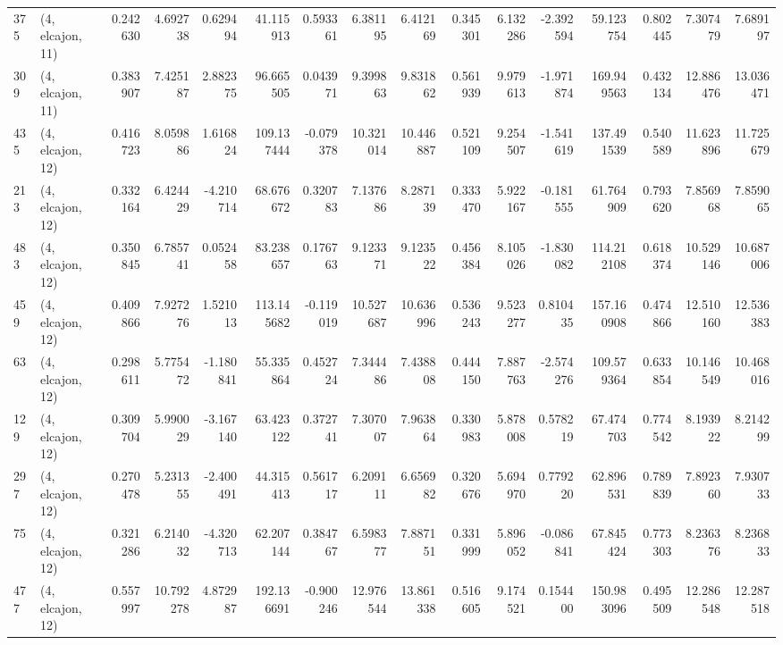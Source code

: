 \begin{tabular}{llrrrrrrrrrrrrrr}
375 &  (4, elcajon, 11) &   0.242630 &   4.692738 &   0.629494 &    41.115913 &   0.593361 &   6.381195 &   6.412169 &  0.345301 &   6.132286 &  -2.392594 &     59.123754 &    0.802445 &    7.307479 &    7.689197 \\
309 &  (4, elcajon, 11) &   0.383907 &   7.425187 &   2.882375 &    96.665505 &   0.043971 &   9.399863 &   9.831862 &  0.561939 &   9.979613 &  -1.971874 &    169.949563 &    0.432134 &   12.886476 &   13.036471 \\
435 &  (4, elcajon, 12) &   0.416723 &   8.059886 &   1.616824 &   109.137444 &  -0.079378 &  10.321014 &  10.446887 &  0.521109 &   9.254507 &  -1.541619 &    137.491539 &    0.540589 &   11.623896 &   11.725679 \\
213 &  (4, elcajon, 12) &   0.332164 &   6.424429 &  -4.210714 &    68.676672 &   0.320783 &   7.137686 &   8.287139 &  0.333470 &   5.922167 &  -0.181555 &     61.764909 &    0.793620 &    7.856968 &    7.859065 \\
483 &  (4, elcajon, 12) &   0.350845 &   6.785741 &   0.052458 &    83.238657 &   0.176763 &   9.123371 &   9.123522 &  0.456384 &   8.105026 &  -1.830082 &    114.212108 &    0.618374 &   10.529146 &   10.687006 \\
459 &  (4, elcajon, 12) &   0.409866 &   7.927276 &   1.521013 &   113.145682 &  -0.119019 &  10.527687 &  10.636996 &  0.536243 &   9.523277 &   0.810435 &    157.160908 &    0.474866 &   12.510160 &   12.536383 \\
63  &  (4, elcajon, 12) &   0.298611 &   5.775472 &  -1.180841 &    55.335864 &   0.452724 &   7.344486 &   7.438808 &  0.444150 &   7.887763 &  -2.574276 &    109.579364 &    0.633854 &   10.146549 &   10.468016 \\
129 &  (4, elcajon, 12) &   0.309704 &   5.990029 &  -3.167140 &    63.423122 &   0.372741 &   7.307007 &   7.963864 &  0.330983 &   5.878008 &   0.578219 &     67.474703 &    0.774542 &    8.193922 &    8.214299 \\
297 &  (4, elcajon, 12) &   0.270478 &   5.231355 &  -2.400491 &    44.315413 &   0.561717 &   6.209111 &   6.656982 &  0.320676 &   5.694970 &   0.779220 &     62.896531 &    0.789839 &    7.892360 &    7.930733 \\
75  &  (4, elcajon, 12) &   0.321286 &   6.214032 &  -4.320713 &    62.207144 &   0.384767 &   6.598377 &   7.887151 &  0.331999 &   5.896052 &  -0.086841 &     67.845424 &    0.773303 &    8.236376 &    8.236833 \\
477 &  (4, elcajon, 12) &   0.557997 &  10.792278 &   4.872987 &   192.136691 &  -0.900246 &  12.976544 &  13.861338 &  0.516605 &   9.174521 &   0.154400 &    150.983096 &    0.495509 &   12.286548 &   12.287518 \\

\end{tabular}
